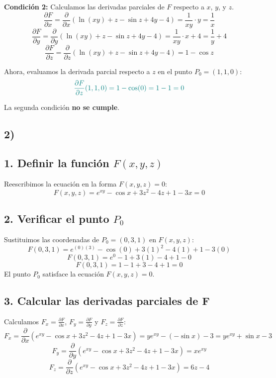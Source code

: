 \documentclass{article}
\begin{document}
\textbf{Condición 2:} Calculamos las derivadas parciales de $F$ respecto a $x$, $y$, y $z$.
\[ \frac{\partial F}{\partial x} = \frac{\partial}{\partial x} (\ln(xy) + z - \sin z + 4y - 4) = \frac{1}{xy} \cdot y = \frac{1}{x} \]
\[ \frac{\partial F}{\partial y} = \frac{\partial}{\partial y} (\ln(xy) + z - \sin z + 4y - 4) = \frac{1}{xy} \cdot x + 4 = \frac{1}{y} + 4 \]
\[ \frac{\partial F}{\partial z} = \frac{\partial}{\partial z} (\ln(xy) + z - \sin z + 4y - 4) = 1 - \cos z \]

Ahora, evaluamos la derivada parcial respecto a $z$ en el punto $P_0 = (1, 1, 0)$:
\[ \color{teal}\frac{\partial F}{\partial z}(1, 1, 0) = 1 - \cos(0) = 1 - 1 = 0 \]

La segunda condición \textbf{\color{teal} no se cumple}.

\subsection*{2)}


\subsection*{1. Definir la función $F(x, y, z)$}
Reescribimos la ecuación en la forma $F(x, y, z) = 0$:
$$F(x, y, z) = e^{xy} - \cos x + 3z^2 - 4z + 1 - 3x = 0$$

\subsection*{2. Verificar el punto $P_0$}
Sustituimos las coordenadas de $P_0 = (0, 3, 1)$ en $F(x, y, z)$:
$$F(0, 3, 1) = e^{(0)(3)} - \cos(0) + 3(1)^2 - 4(1) + 1 - 3(0)$$
$$F(0, 3, 1) = e^0 - 1 + 3(1) - 4 + 1 - 0$$
$$F(0, 3, 1) = 1 - 1 + 3 - 4 + 1 = 0$$
El punto $P_0$ satisface la ecuación $F(x, y, z) = 0$.

\subsection*{3. Calcular las derivadas parciales de F}
Calculamos $F_x = \frac{\partial F}{\partial x}$, $F_y = \frac{\partial F}{\partial y}$ y $F_z = \frac{\partial F}{\partial z}$:
$$F_x = \frac{\partial}{\partial x} (e^{xy} - \cos x + 3z^2 - 4z + 1 - 3x) = y e^{xy} - (-\sin x) - 3 = y e^{xy} + \sin x - 3$$
$$F_y = \frac{\partial}{\partial y} (e^{xy} - \cos x + 3z^2 - 4z + 1 - 3x) = x e^{xy}$$
$$F_z = \frac{\partial}{\partial z} (e^{xy} - \cos x + 3z^2 - 4z + 1 - 3x) = 6z - 4$$
\end{document}
